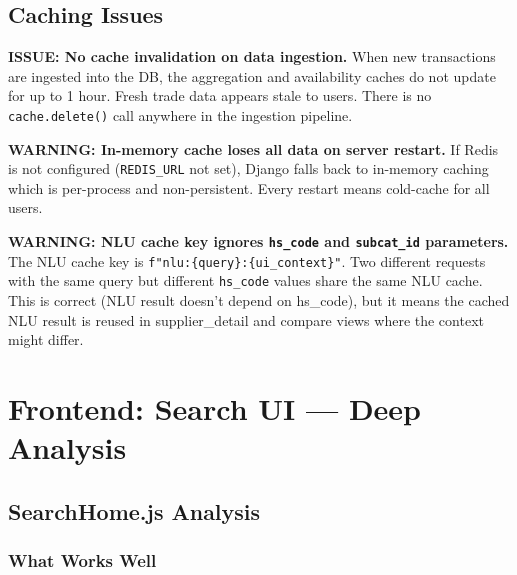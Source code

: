 \documentclass[12pt,a4paper]{article}
\begin{document}
\subsection{Caching Issues}

\begin{issueBox}
\textbf{ISSUE: No cache invalidation on data ingestion.}
When new transactions are ingested into the DB, the aggregation and availability caches
do not update for up to 1 hour. Fresh trade data appears stale to users.
There is no \texttt{cache.delete()} call anywhere in the ingestion pipeline.
\end{issueBox}

\begin{warnBox}
\textbf{WARNING: In-memory cache loses all data on server restart.}
If Redis is not configured (\texttt{REDIS\_URL} not set), Django falls back to in-memory
caching which is per-process and non-persistent. Every restart means cold-cache for
all users.
\end{warnBox}

\begin{warnBox}
\textbf{WARNING: NLU cache key ignores \texttt{hs\_code} and \texttt{subcat\_id} parameters.}
The NLU cache key is \texttt{f"nlu:\{query\}:\{ui\_context\}"}. Two different requests
with the same query but different \texttt{hs\_code} values share the same NLU cache.
This is correct (NLU result doesn't depend on hs\_code), but it means the cached
NLU result is reused in supplier\_detail and compare views where the context might differ.
\end{warnBox}

\section{Frontend: Search UI --- Deep Analysis}

\subsection{SearchHome.js Analysis}

\subsubsection{What Works Well}
\end{document}
